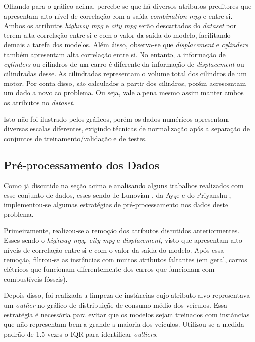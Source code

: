 \documentclass{report}
\begin{document}
Olhando para o gráfico acima, percebe-se que há diversos atributos preditores que apresentam alto nível de correlação com a saída \textit{combination mpg} e entre si. Ambos os atributos
\textit{highway mpg} e \textit{city mpg} serão descartados do \textit{dataset} por terem alta correlação entre si e com o valor da saída do modelo, facilitando demais a tarefa dos modelos.
Além disso, observa-se que \textit{displacement} e \textit{cylinders} também apresentam alta correlação entre si. No entanto, a informação de \textit{cylinders} ou cilindros de um carro é diferente
da informação de \textit{displacement} ou cilindradas desse. As cilindradas representam o volume total dos cilindros de um motor. Por conta disso, são calculados a partir dos cilindros, porém
acrescentam um dado a novo ao problema. Ou seja, vale a pena mesmo assim manter ambos os atributos no \textit{dataset}.

Isto não foi ilustrado pelos gráficos, porém os dados numéricos apresentam diversas escalas diferentes, exigindo técnicas de normalização após a separação de conjuntos de treinamento/validação
e de testes.

\subsection{Pré-processamento dos Dados} \label{subsec:pre-proc-de-dados}

Como já discutido na seção acima e analisando alguns trabalhos realizados com esse conjunto de dados, esses sendo de Lunovian \cite{Lunovian}, da Ayşe \cite{Ayşe} e do Priyanshu \cite{Priyanshu},
implementou-se algumas estratégias de pré-processamento nos dados deste problema.

Primeiramente, realizou-se a remoção dos atributos discutidos anteriormentes. Esses sendo o \textit{highway mpg}, \textit{city mpg} e \textit{displacement}, visto que apresentam alto níveis de
correlação entre si e com o valor da saída do modelo. Após essa remoção, filtrou-se as instâncias com muitos atributos faltantes (em geral, carros elétricos que funcionam diferentemente dos carros
que funcionam com combustíveis fósseis).

Depois disso, foi realizada a limpeza de instâncias cujo atributo alvo representava um \textit{outlier} no gráfico de distribuição de consumo médio dos veículos. Essa estratégia é necessária para
evitar que os modelos sejam treinados com instâncias que não representam bem a grande a maioria dos veículos. Utilizou-se a medida padrão de 1.5 vezes o IQR para identificar \textit{outliers}.
\end{document}
